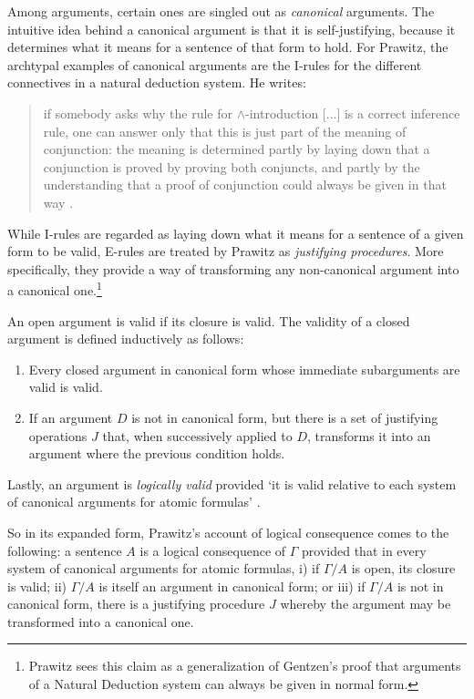 	Among arguments, certain ones are singled out as \textit{canonical} arguments. The intuitive idea behind a canonical argument is that it is self-justifying, because it determines what it means for a sentence of that form to hold. For Prawitz, the archtypal examples of canonical arguments are the I-rules for the different connectives in a natural deduction system. He writes:
	\begin{quote}
		if somebody asks why the rule for $\wedge$-introduction [...] is a correct inference rule, one can answer only that this is just part of the meaning of conjunction: the meaning is determined partly by laying down that a conjunction is proved by proving both conjuncts, and partly by the understanding that a proof of conjunction could always be given in that way \cite[163]{Prawitz1985}. 
	\end{quote}
	While I-rules are regarded as laying down what it means for a sentence of a given form to be valid, E-rules are treated by Prawitz as \textit{justifying procedures}. More specifically, they provide a way of transforming any non-canonical argument into a canonical one.\footnote{Prawitz sees this claim as a generalization of Gentzen's proof that arguments of a Natural Deduction system can always be given in normal form.}
	
	An open argument is valid if its closure is valid. The validity of a closed argument is defined inductively as follows: 
	\begin{enumerate}
		\item Every closed argument in canonical form whose immediate subarguments are valid is valid.
		\item If an argument $D$ is not in canonical form, but there is a set of justifying operations $J$ that, when successively applied to $D$, transforms it into an argument where the previous condition holds.
	\end{enumerate}
	
	Lastly, an argument is \textit{logically valid} provided `it is valid relative to each system of canonical arguments for atomic formulas' \cite[165]{Prawitz1985}.
	
	So in its expanded form, Prawitz's account of logical consequence comes to the following: a sentence $A$ is a logical consequence of $\Gamma$ provided that in every system of canonical arguments for atomic formulas, i) if $\Gamma / A$ is open, its closure is valid; ii) $\Gamma / A$ is itself an argument in canonical form; or iii) if $\Gamma / A$ is not in canonical form, there is a justifying procedure $J$ whereby the argument may be transformed into a canonical one.
	
